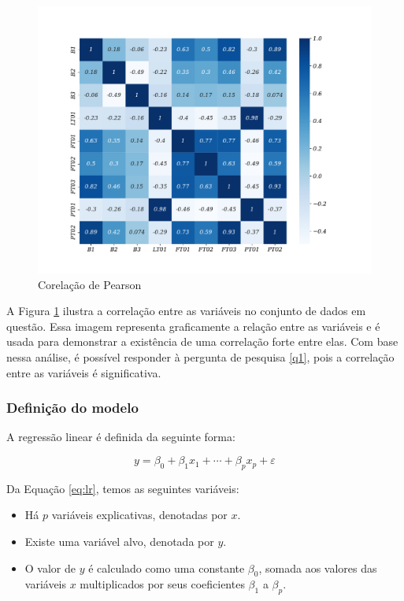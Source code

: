 \begin{figure}[!htb]
	\centering
	\caption{Corelação de Pearson}
	\label{fig:person}
	\includegraphics[width=0.82\linewidth]{Apendices/Figuras/modelagem-24h/person}
	
\end{figure}

A Figura \ref{fig:person} ilustra a correlação entre as variáveis no conjunto de dados em questão. Essa imagem representa graficamente a relação entre as variáveis e é usada para demonstrar a existência de uma correlação forte entre elas. Com base nessa análise, é possível responder à pergunta de pesquisa \ref{q1}, pois a correlação entre as variáveis é significativa.

\subsubsection{Defini\c c\~ ao do modelo}

A regressão linear é definida da seguinte forma:

\begin{equation}
	y = \beta_0 + \beta_1 x_1 + \cdots + \beta_p x_p + \varepsilon \label{eq:lr}
\end{equation}

Da Equação \eqref{eq:lr}, temos as seguintes variáveis:

\begin{itemize}
	\item Há $p$ variáveis explicativas, denotadas por $x$.
	\item Existe uma variável alvo, denotada por $y$.
	\item O valor de $y$ é calculado como uma constante $\beta_0$, somada aos valores das variáveis $x$ multiplicados por seus coeficientes $\beta_1$ a $\beta_p$.
\end{itemize}

